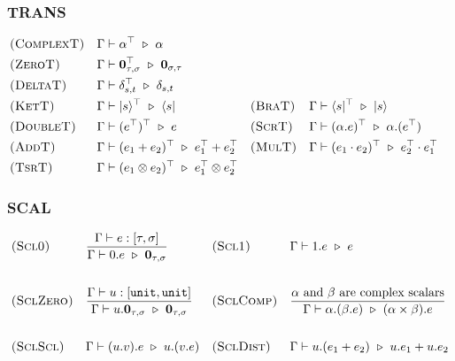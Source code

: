\subsubsection*{\textsf{TRANS}}
\begin{align*}
  & \textsc{(ComplexT)} && \Gamma \vdash \alpha^\top \ \triangleright\  \alpha \\
  & \textsc{(ZeroT)} && \Gamma \vdash \textbf{0}_{\tau, \sigma}^\top \ \triangleright\  \textbf{0}_{\sigma, \tau} \\
  & \textsc{(DeltaT)} && \Gamma \vdash \delta_{s,t}^\top \ \triangleright\  \delta_{s,t} \\
  & \textsc{(KetT)} && \Gamma \vdash |s\rangle^\top \ \triangleright\  \langle s| 
  && \textsc{(BraT)} && \Gamma \vdash \langle s|^\top \ \triangleright\  |s\rangle \\
  & \textsc{(DoubleT)} && \Gamma \vdash (e^\top)^\top \ \triangleright\  e 
  && \textsc{(ScrT)} && \Gamma \vdash (\alpha.e)^\top \ \triangleright\  \alpha.(e^\top) \\
  & \textsc{(AddT)} && \Gamma \vdash (e_1 + e_2)^\top \ \triangleright\  e_1^\top + e_2^\top
  && \textsc{(MulT)} && \Gamma \vdash (e_1 \cdot e_2)^\top \ \triangleright\  e_2^\top \cdot e_1^\top \\
  & \textsc{(TsrT)} && \Gamma \vdash (e_1 \otimes e_2)^\top \ \triangleright\  e_1^\top \otimes e_2^\top
\end{align*}

\subsubsection*{\textsf{SCAL}}
\begin{align*}
  & \textsc{(Scl0)} && \frac{\Gamma \vdash e : [\tau, \sigma]}{\Gamma \vdash 0.e \ \triangleright\  \textbf{0}_{\tau, \sigma}}
  && \textsc{(Scl1)} && \Gamma \vdash 1.e \ \triangleright\  e \\
  \\
  & \textsc{(SclZero)} && \frac{\Gamma \vdash u : [\texttt{unit}, \texttt{unit}]}{\Gamma \vdash u.\mathbf{0}_{\tau, \sigma} \ \triangleright\  \mathbf{0}_{\tau, \sigma}}
  && \textsc{(SclComp)} && 
  \frac{\textrm{$\alpha$ and $\beta$ are complex scalars}}{\Gamma \vdash \alpha.(\beta.e) \ \triangleright\  (\alpha \times \beta).e} \\
  \\
  & \textsc{(SclScl)} && \Gamma \vdash (u.v).e \ \triangleright\  u.(v.e)
  && \textsc{(SclDist)} && \Gamma \vdash u.(e_1 + e_2) \ \triangleright\  u.e_1 + u.e_2
\end{align*}

